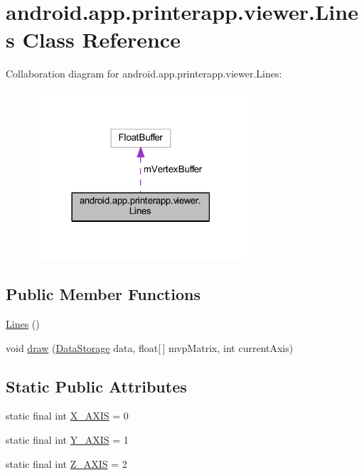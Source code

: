 \hypertarget{classandroid_1_1app_1_1printerapp_1_1viewer_1_1_lines}{}\section{android.\+app.\+printerapp.\+viewer.\+Lines Class Reference}
\label{classandroid_1_1app_1_1printerapp_1_1viewer_1_1_lines}


Collaboration diagram for android.\+app.\+printerapp.\+viewer.\+Lines\+:
\nopagebreak
\begin{figure}[H]
\begin{center}
\leavevmode
\includegraphics[width=225pt]{classandroid_1_1app_1_1printerapp_1_1viewer_1_1_lines__coll__graph}
\end{center}
\end{figure}
\subsection*{Public Member Functions}
\begin{DoxyCompactItemize}
\item 
\hyperlink{classandroid_1_1app_1_1printerapp_1_1viewer_1_1_lines_aec7c4103762805af4cb237efc213af5e}{Lines} ()
\item 
void \hyperlink{classandroid_1_1app_1_1printerapp_1_1viewer_1_1_lines_a668b681901515b4d14e85954ef890974}{draw} (\hyperlink{classandroid_1_1app_1_1printerapp_1_1viewer_1_1_data_storage}{Data\+Storage} data, float\mbox{[}$\,$\mbox{]} mvp\+Matrix, int current\+Axis)
\end{DoxyCompactItemize}
\subsection*{Static Public Attributes}
\begin{DoxyCompactItemize}
\item 
static final int \hyperlink{classandroid_1_1app_1_1printerapp_1_1viewer_1_1_lines_a039005dfdef61b25986a6a6be2f3ef71}{X\+\_\+\+A\+X\+IS} = 0
\item 
static final int \hyperlink{classandroid_1_1app_1_1printerapp_1_1viewer_1_1_lines_aa516ee318aaa436e0378f30bc85cd0b2}{Y\+\_\+\+A\+X\+IS} = 1
\item 
static final int \hyperlink{classandroid_1_1app_1_1printerapp_1_1viewer_1_1_lines_adfbb470ae7e4548d3157474d18973aff}{Z\+\_\+\+A\+X\+IS} = 2
\end{DoxyCompactItemize}


